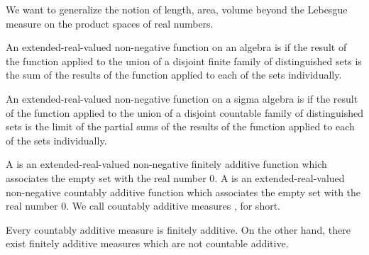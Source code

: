 
\sbasic


























\sstart
{}


We want to generalize the notion of length, area, volume beyond the Lebesgue measure on the product spaces of real numbers.


An extended-real-valued non-negative
function on an algebra is
if the result of the function applied to
the union of a disjoint finite family of
distinguished sets is the sum of the
results of the function applied to each
of the sets individually.

An extended-real-valued non-negative
function on a sigma algebra is
if the result of the function applied to
the union of a disjoint countable family of
distinguished sets is the limit of the partial
sums of the results of the function applied
to each of the sets individually.

A
is an extended-real-valued non-negative
finitely additive function which associates the empty
set with the real number $0$.
A
is an extended-real-valued non-negative
countably additive function which associates the empty
set with the real number $0$.
We call countably additive measures
, for short.

Every countably additive measure is finitely additive.
On the other hand, there exist finitely additive measures
which are not countable additive.

